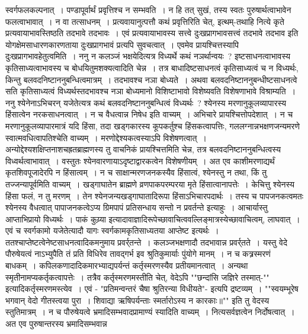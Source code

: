 स्वर्गफलकल्पनात्~। पण्डापूर्वार्थं प्रवृत्तिश्च न सम्भवति~। न हि तत् सुखं, तस्य स्वतः पुरुषार्थत्वाभावेन फलत्वाभावात्~। न वा तत्साधनम्~। प्रत्यवायानुत्पत्तौ कथं
प्रवृत्तिरिति चेत्, इत्थम्-तथाहि नित्ये कृते प्रत्यवायाभावस्तिष्ठति तदभावे तदभावः~। एवं प्रत्यवायाभावस्य सत्त्वे दुःखप्रागभावसत्त्वं तदभावे तदभाव इति योगक्षेमसाधारणकारणताया
दुःखप्रागभावं प्रत्यपि सुवचत्वात्~। एवमेव प्रायश्चित्तस्यापि दुःखप्रागभावहेतुत्वमिति~।
ननु न कलञ्जं भक्षयेदित्यत्र विध्यर्थे कथं नञर्थान्वयः~? इष्टसाधनत्वाभावस्य कृतिसाध्यत्वाभावस्य च बोधयितुमशक्यत्वादिति चेन्न~। तत्र बाधादिष्टसाधनत्वं
कृतिसाध्यत्वं च न विध्यर्थः, किन्तु बलवदनिष्टाननुबन्धित्वमात्रम्~। तदभावश्च नञा बोध्यते~। अथवा बलवदनिष्टाननुबन्धीष्टसाधनत्वे सति कृतिसाध्यत्वं विध्यर्थस्तदभावश्च
नञा बोध्यमानो विशिष्टाभावो विशेष्यवति विशेषणाभावे विश्राम्यति~।
ननु श्येनेनाऽभिचरन् यजेतेत्यत्र कथं बलवदनिष्टाननुबन्धित्वं विध्यर्थः~? श्येनस्य मरणानुकूलव्यापारस्य हिंसात्वेन नरकसाधनत्वात्~। न च वैधत्वान्न निषेध इति
वाच्यम्~। अभिचारे प्रायश्चित्तोपदेशात्~।
न च मरणानुकूलव्यापारमात्रं यदि हिंसा, तदा खड्गकारस्य कूपकर्तुश्च हिंसकत्वापत्तिः, गललग्नान्नभक्षणजन्यमरणे स्वात्मवधित्वापतिश्चेति वाच्यम्~। मरणोद्देश्यकत्वस्याऽपि
विशेषणत्वात्~। अन्योद्देश्यशक्षिप्तनाशचह्रतब्राह्मणस्य तु वाचनिकं प्रायश्चित्तमिति चेन्न, तत्र बलवदनिष्टाननुबन्धित्वस्य विध्वर्थत्वाभावात्~। वस्तुतः श्येनवारणायाऽदृष्टाद्वारकत्वेन
विशेषणीयम्~। अत एव काशीमरणाद्यर्थं कृतशिवपूजादेरपि न हिंसात्वम्~। न च साक्षान्मरणजनकस्यैव हिंसात्वं, श्येनस्तु न तथा, किं तु तज्जन्यापूर्वमिति वाच्यम्~।
खड्गाघातेन ब्राह्मणे व्रणपाकपरम्परया मृते हिंसात्वानापत्तेः~।
केचित्तु श्येनस्य हिंसा फलं, न तु मरणम्~। तेन श्येनजन्यखड्गाघातादिरूपा हिंसाऽभिचारपदार्थः~। तस्य च पापजनकत्वमतः श्येनस्य वैधत्वात् पापाजनकत्वेऽप्य
ग्रिमपापं प्रतिसन्धाय सन्तो न प्रवर्तन्ते इत्याहुः~।
आचार्यास्तु आप्ताभिप्रायो विध्यर्थः~। पाकं कुय्र्या इत्यादावाज्ञादिरूपेच्छावाचित्ववल्लिङ्मात्रस्येच्छावाचित्वम्, लाघवात्~। एवं च स्वर्गकामो यजेतेत्यादौ यागः
स्वर्गकामकृतिसाध्यतया आप्तेष्ट इत्यर्थः~। ततश्चाप्तेष्टत्वेनेष्टसाधनत्वादिकमनुमाय प्रवर्र्तन्ते~। कलञ्जभक्षणादौ तदभावान्न प्रवर्र्तते~। यस्तु वेदे पौरुषेयत्वं नाऽभ्युपैति तं
प्रति विधिरेव तावद्गर्भ इव श्रुतिकुमार्याः पुंयोगे मानम्~। न च कत्र्रस्मरणं बाधकम्~। कपिलकणादादिकमारभ्याद्यपर्यन्तं कर्तृस्मरणस्यैव प्रतीयमानत्वात्~। अन्यथा
स्मृतीनामप्यकर्तृकत्वापत्तेः~। तत्रैव कर्तृस्मरणमस्तीति चेत्, वेदेऽपि ""छन्दांसि जज्ञिरे तस्मात्-"" इत्यादिकर्तृस्मरणमस्त्येव~। एवं -
"प्रतिमन्वन्तरं चैषा श्रुतिरन्या विधीयते"- इत्यपि द्रष्टव्यम्~।
""स्वयम्भूरेष भगवान् वेदो गीतस्त्वया पुरा~।
शिवाद्या ऋषिपर्यन्ताः स्मर्तारोऽस्य न कारकाः॥""
इति तु वेदस्य स्तुतिमात्रम्~। न च पौरुषेयत्वे भ्रमादिसम्भवादप्रामाण्यं स्यादिति वाच्यम्~। नित्यसर्वज्ञत्वेन निर्दोषत्वात्~। अत एव पुरुषान्तरस्य भ्रमादिसम्भवान्न
